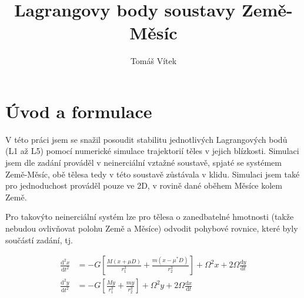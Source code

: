 \documentclass[a4paper,11pt]{article}
\begin{document}
\title{Lagrangovy body soustavy Země-Měsíc}
\author{Tomáš Vítek}

\maketitle
\section{Úvod a formulace}
V této práci jsem se snažil posoudit stabilitu jednotlivých Lagrangových bodů (L1 až L5) pomocí
numerické simulace trajektorií těles v jejich blízkosti. Simulaci jsem dle zadání prováděl
v neinerciální vztažné soustavě, spjaté se systémem Země-Měsíc, obě tělesa tedy v této soustavě 
zůstávala v klidu. Simulaci jsem také pro jednoduchost prováděl pouze ve 2D, v rovině dané oběhem Měsíce kolem Země.

Pro takovýto neinerciální systém lze pro tělesa o zanedbatelné hmotnosti (takže nebudou ovlivňovat polohu Země a Měsíce)
odvodit pohybové rovnice, které byly součástí zadání, tj.

\begin{align*}
    \frac{\mathrm{d}^2 x}{\mathrm{d}t^2} &= -G \left[ \frac{M (x + \mu D)}{r_1^3} + \frac{m (x - \mu^* D)}{r_2^3} \right] + \Omega^2 x + 2 \Omega \frac{\mathrm{d} y}{\mathrm{d}t} \\
    \frac{\mathrm{d}^2 y}{\mathrm{d}t^2} &= -G \left[ \frac{M y}{r_1^3} + \frac{m y}{r_2^3} \right] + \Omega^2 y + 2 \Omega \frac{\mathrm{d} x}{\mathrm{d}t} \\
\end{align*}
\end{document}
